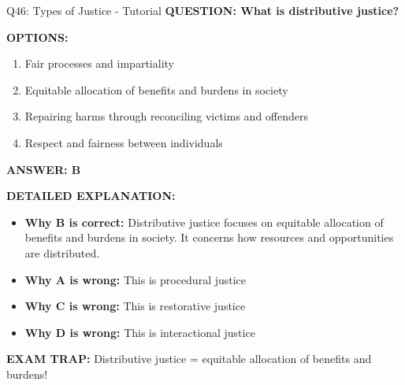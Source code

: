 \documentclass[8pt]{beamer}
\begin{document}
	\begin{frame}{Q46: Types of Justice - Tutorial}
		\fontsize{6.5}{7.5}\selectfont
		\textbf{QUESTION: What is distributive justice?}
		
		\vspace{0.1cm}
		\textbf{OPTIONS:}
		\begin{enumerate}
			\item Fair processes and impartiality
			\item Equitable allocation of benefits and burdens in society
			\item Repairing harms through reconciling victims and offenders
			\item Respect and fairness between individuals
		\end{enumerate}
		
		\vspace{0.1cm}
		\textcolor{myblue}{\textbf{ANSWER: B}}
		
		\vspace{0.1cm}
		\textbf{DETAILED EXPLANATION:}
		\begin{itemize}
			\item \textbf{Why B is correct:} Distributive justice focuses on equitable allocation of benefits and burdens in society. It concerns how resources and opportunities are distributed.
			\item \textbf{Why A is wrong:} This is procedural justice
			\item \textbf{Why C is wrong:} This is restorative justice
			\item \textbf{Why D is wrong:} This is interactional justice
		\end{itemize}
		
		\textcolor{myred}{\textbf{EXAM TRAP:}} Distributive justice = \textcolor{myblue}{equitable allocation of benefits and burdens}!
	\end{frame}
	
\end{document}
